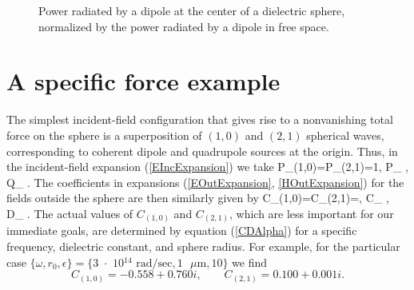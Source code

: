 \documentclass[letterpaper]{article}
\begin{document}
\begin{figure}[H]
\begin{center}
\caption{Power radiated by a dipole at the center of a dielectric
sphere, normalized by the power radiated by a dipole in free space.}
\end{center}
\end{figure}

\newpage
\section{A specific force example}

The simplest incident-field configuration that gives rise to a
nonvanishing total force on the sphere is a superposition of 
$(1,0)$ and $(2,1)$ spherical waves, corresponding to coherent
dipole and quadrupole sources at the origin. Thus, in the
incident-field expansion (\ref{EIncExpansion}) we take
{
 P_{(1,0)}=P_{(2,1)}=1,
 \qquad 
 P_ \alpha, 
 \qquad 
 Q_ \alpha.
}
The coefficients in expansions (\ref{EOutExpansion}, 
\ref{HOutExpansion}) for the fields outside the sphere 
are then similarly given by 
{
 C_{(1,0)}=C_{(2,1)}=,
 \qquad 
 C_ \alpha, 
 \qquad 
 D_ \alpha.
}
The actual values of $C_{(1,0)}$ and $C_{(2,1)}$, which
are less important for our immediate goals, are determined
by equation (\ref{CDAlpha}) for a specific frequency,
dielectric constant, and sphere radius. For example, 
for the particular case 
$\{ \omega, r_0, \epsilon\}
 =
 \{ \text{3 $\cdot$ 10$^{14}$ rad/sec},
    1\text{ $\mu$m},
    10
\}$
we find
$$ C_{(1,0)}=-0.558 + 0.760i, \qquad
   C_{(2,1)}= 0.100 + 0.001i.
$$
\end{document}
